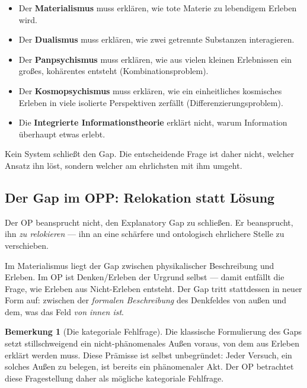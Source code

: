 \documentclass[11pt,a4paper]{article}
\theoremstyle{plain}
\theoremstyle{definition}
\newtheorem{remark}{Bemerkung}[section]
\begin{document}
\begin{itemize}
  \item Der \textbf{Materialismus} muss erkl\"{a}ren, wie tote Materie zu lebendigem
        Erleben wird.
  \item Der \textbf{Dualismus} muss erkl\"{a}ren, wie zwei getrennte Substanzen
        interagieren.
  \item Der \textbf{Panpsychismus} muss erkl\"{a}ren, wie aus vielen kleinen
        Erlebnissen ein gro\ss{}es, koh\"{a}rentes entsteht (Kombinationsproblem).
  \item Der \textbf{Kosmopsychismus} muss erkl\"{a}ren, wie ein einheitliches
        kosmisches Erleben in viele isolierte Perspektiven zerf\"{a}llt
        (Differenzierungsproblem).
  \item Die \textbf{Integrierte Informationstheorie} erkl\"{a}rt nicht, warum
        Information \"{u}berhaupt etwas erlebt.
\end{itemize}

Kein System schlie\ss{}t den Gap. Die entscheidende Frage ist daher nicht, welcher
Ansatz ihn l\"{o}st, sondern welcher am ehrlichsten mit ihm umgeht.

\subsection{Der Gap im OPP: Relokation statt L\"{o}sung}

Der OP beansprucht nicht, den Explanatory Gap zu schlie\ss{}en. Er beansprucht, ihn
\emph{zu relokieren} --- ihn an eine sch\"{a}rfere und ontologisch ehrlichere Stelle
zu verschieben.

Im Materialismus liegt der Gap zwischen physikalischer Beschreibung und Erleben. Im OP
ist Denken/Erleben der Urgrund selbst --- damit entf\"{a}llt die Frage, wie Erleben aus
Nicht-Erleben entsteht. Der Gap tritt stattdessen in neuer Form auf: zwischen der
\emph{formalen Beschreibung} des Denkfeldes von au\ss{}en und dem, was das Feld
\emph{von innen ist}.

\begin{remark}[Die kategoriale Fehlfrage]
Die klassische Formulierung des Gaps setzt stillschweigend ein nicht-ph\"{a}nomenales
Au\ss{}en voraus, von dem aus Erleben erkl\"{a}rt werden muss. Diese Pr\"{a}misse ist
selbst unbegr\"{u}ndet: Jeder Versuch, ein solches Au\ss{}en zu belegen, ist bereits
ein ph\"{a}nomenaler Akt. Der OP betrachtet diese Fragestellung daher als m\"{o}gliche
kategoriale Fehlfrage.
\end{remark}
\end{document}

